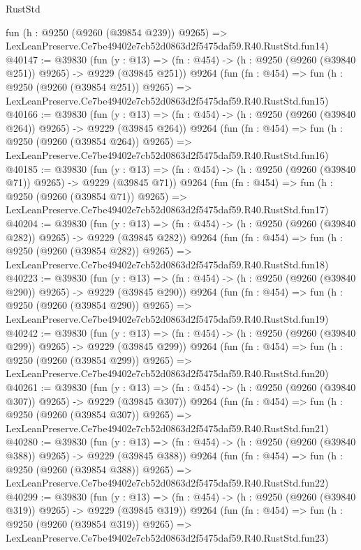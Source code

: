 \begin{lexlean}{RustStd}
\begin{coremodule}
    fun (h : @9250 (@9260 (@39854 @239)) @9265) =>
    LexLeanPreserve.Ce7be49402e7cb52d0863d2f5475daf59.R40.RustStd.fun14)
@40147 := @39830
    (fun (y : @13) => (fn : @454) -> (h : @9250 (@9260 (@39840 @251)) @9265) -> @9229 (@39845 @251))
    @9264
    (fun (fn : @454) =>
    fun (h : @9250 (@9260 (@39854 @251)) @9265) =>
    LexLeanPreserve.Ce7be49402e7cb52d0863d2f5475daf59.R40.RustStd.fun15)
@40166 := @39830
    (fun (y : @13) => (fn : @454) -> (h : @9250 (@9260 (@39840 @264)) @9265) -> @9229 (@39845 @264))
    @9264
    (fun (fn : @454) =>
    fun (h : @9250 (@9260 (@39854 @264)) @9265) =>
    LexLeanPreserve.Ce7be49402e7cb52d0863d2f5475daf59.R40.RustStd.fun16)
@40185 := @39830
    (fun (y : @13) => (fn : @454) -> (h : @9250 (@9260 (@39840 @71)) @9265) -> @9229 (@39845 @71))
    @9264
    (fun (fn : @454) =>
    fun (h : @9250 (@9260 (@39854 @71)) @9265) =>
    LexLeanPreserve.Ce7be49402e7cb52d0863d2f5475daf59.R40.RustStd.fun17)
@40204 := @39830
    (fun (y : @13) => (fn : @454) -> (h : @9250 (@9260 (@39840 @282)) @9265) -> @9229 (@39845 @282))
    @9264
    (fun (fn : @454) =>
    fun (h : @9250 (@9260 (@39854 @282)) @9265) =>
    LexLeanPreserve.Ce7be49402e7cb52d0863d2f5475daf59.R40.RustStd.fun18)
@40223 := @39830
    (fun (y : @13) => (fn : @454) -> (h : @9250 (@9260 (@39840 @290)) @9265) -> @9229 (@39845 @290))
    @9264
    (fun (fn : @454) =>
    fun (h : @9250 (@9260 (@39854 @290)) @9265) =>
    LexLeanPreserve.Ce7be49402e7cb52d0863d2f5475daf59.R40.RustStd.fun19)
@40242 := @39830
    (fun (y : @13) => (fn : @454) -> (h : @9250 (@9260 (@39840 @299)) @9265) -> @9229 (@39845 @299))
    @9264
    (fun (fn : @454) =>
    fun (h : @9250 (@9260 (@39854 @299)) @9265) =>
    LexLeanPreserve.Ce7be49402e7cb52d0863d2f5475daf59.R40.RustStd.fun20)
@40261 := @39830
    (fun (y : @13) => (fn : @454) -> (h : @9250 (@9260 (@39840 @307)) @9265) -> @9229 (@39845 @307))
    @9264
    (fun (fn : @454) =>
    fun (h : @9250 (@9260 (@39854 @307)) @9265) =>
    LexLeanPreserve.Ce7be49402e7cb52d0863d2f5475daf59.R40.RustStd.fun21)
@40280 := @39830
    (fun (y : @13) => (fn : @454) -> (h : @9250 (@9260 (@39840 @388)) @9265) -> @9229 (@39845 @388))
    @9264
    (fun (fn : @454) =>
    fun (h : @9250 (@9260 (@39854 @388)) @9265) =>
    LexLeanPreserve.Ce7be49402e7cb52d0863d2f5475daf59.R40.RustStd.fun22)
@40299 := @39830
    (fun (y : @13) => (fn : @454) -> (h : @9250 (@9260 (@39840 @319)) @9265) -> @9229 (@39845 @319))
    @9264
    (fun (fn : @454) =>
    fun (h : @9250 (@9260 (@39854 @319)) @9265) =>
    LexLeanPreserve.Ce7be49402e7cb52d0863d2f5475daf59.R40.RustStd.fun23)

\end{coremodule}
\end{lexlean}
